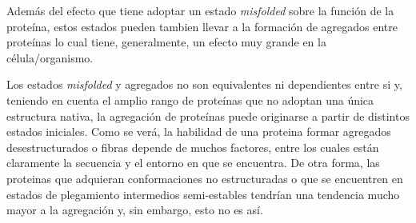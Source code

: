 Además del efecto que tiene adoptar un estado \textit{misfolded} sobre la función de la proteína, estos estados pueden tambien llevar a la formación de agregados entre proteínas
lo cual tiene, generalmente, un efecto muy grande en la célula/organismo.

Los estados \textit{misfolded} y agregados no son equivalentes ni dependientes entre si y, 
teniendo en cuenta el amplio rango de proteínas que no adoptan una única estructura nativa, la agregación de proteínas puede originarse a partir de distintos estados iniciales. 
Como se verá, la habilidad de una proteina formar agregados desestructurados o fibras depende de muchos factores, entre los cuales están claramente la secuencia y el entorno en que se encuentra.
De otra forma, las proteinas que adquieran conformaciones no estructuradas o que se encuentren en estados de plegamiento intermedios semi-estables tendrían una tendencia mucho mayor a la agregación y, sin embargo, esto no es así. 








